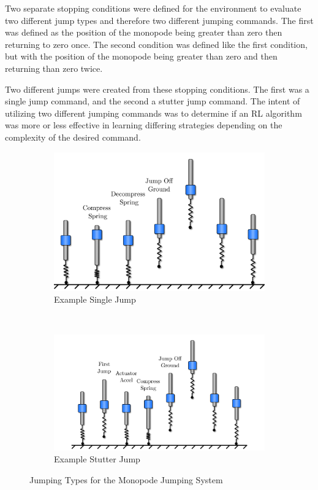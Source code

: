 Two separate stopping conditions were defined for the environment to evaluate two different jump types and therefore two different jumping commands. The first was defined as the position of the monopode being greater than zero then returning to zero once. The second condition was defined like the first condition, but with the position of the monopode being greater than zero and then returning than zero twice.

Two different jumps were created from these stopping conditions. The first was a single jump command, and the second a stutter jump command. The intent of utilizing two different jumping commands was to determine if an RL algorithm was more or less effective in learning differing strategies depending on the complexity of the desired command. 

% 
\begin{figure}[tb!]
  \centering
  \begin{subfigure}{.75\textwidth}
    \centering
    \includegraphics[width=\linewidth]{Figures/Ch2/single_jump.png}
    \caption{Example Single Jump}
    \label{fig:singleJump}
  \end{subfigure} \\
  \begin{subfigure}{.9\textwidth}
    \centering
    \includegraphics[width=\linewidth]{Figures/Ch2/stutter_jump.png}
     \caption{Example Stutter Jump}
     \label{fig:stutterJump}
  \end{subfigure}
   \caption{Jumping Types for the Monopode Jumping System}
   \label{fig:jump_types}
\end{figure} 

